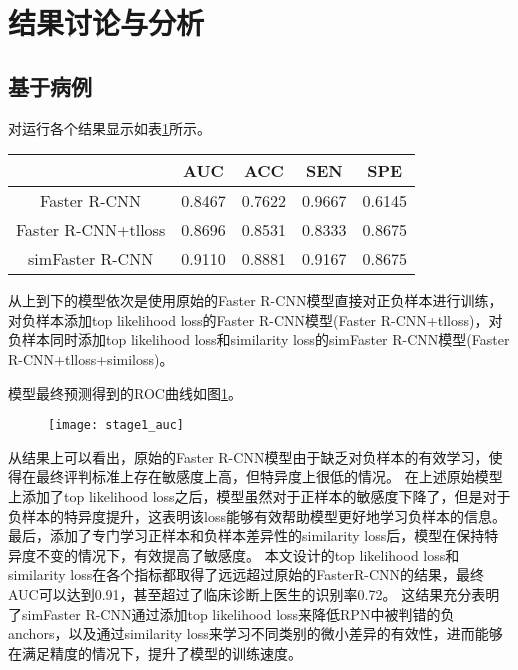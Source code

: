 \section{结果讨论与分析}
\subsection{基于病例}
对运行各个结果显示如表\ref{tab:1_stage_pred_result_based_on_patient}所示。

\begin{table}[!htbp]
    \label{tab:1_stage_pred_result_based_on_patient}
    \centering
    \footnotesize%
    \setlength{\tabcolsep}{4pt}%
    \renewcommand{\arraystretch}{1.2}%
    \begin{tabular}{ccccc}
        \hline
        &AUC& ACC &SEN &SPE\\
        \hline
        Faster R-CNN& 0.8467 &0.7622 &0.9667 &0.6145 \\
        Faster R-CNN+tlloss& 0.8696 &0.8531 &0.8333 &0.8675 \\
        simFaster R-CNN& 0.9110 &0.8881 &0.9167 &0.8675 \\
        \hline
    \end{tabular}
\end{table}

从上到下的模型依次是使用原始的Faster R-CNN模型直接对正负样本进行训练，对负样本添加top likelihood loss的Faster R-CNN模型(Faster R-CNN+tlloss)，对负样本同时添加top likelihood loss和similarity loss的simFaster R-CNN模型(Faster R-CNN+tlloss+similoss)。

模型最终预测得到的ROC曲线如图\ref{fig:stage1_auc}。
		\begin{figure}[!htbp]
    \centering
    \texttt{[image: stage1\_auc]}
    \label{fig:stage1_auc}
	\end{figure}
从结果上可以看出，原始的Faster R-CNN模型由于缺乏对负样本的有效学习，使得在最终评判标准上存在敏感度上高，但特异度上很低的情况。
在上述原始模型上添加了top likelihood loss之后，模型虽然对于正样本的敏感度下降了，但是对于负样本的特异度提升，这表明该loss能够有效帮助模型更好地学习负样本的信息。
最后，添加了专门学习正样本和负样本差异性的similarity loss后，模型在保持特异度不变的情况下，有效提高了敏感度。
本文设计的top likelihood loss和similarity loss在各个指标都取得了远远超过原始的FasterR-CNN的结果，最终AUC可以达到0.91，甚至超过了临床诊断上医生的识别率0.72。
这结果充分表明了simFaster R-CNN通过添加top likelihood loss来降低RPN中被判错的负anchors，以及通过similarity loss来学习不同类别的微小差异的有效性，进而能够在满足精度的情况下，提升了模型的训练速度。
	
